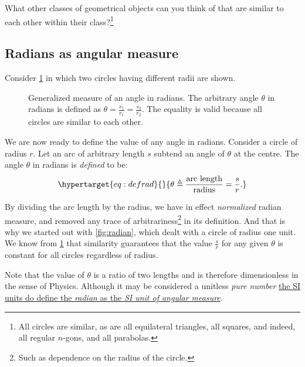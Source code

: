 \documentclass[
  a4paper,
]{article}
\begin{document}
What other classes of geometrical objects can you think of that are
similar to each other within their class?\footnote{All circles are
  similar, as are all equilateral triangles, all squares, and indeed,
  all regular \(n\)-gons, and all parabolas.}

\hypertarget{radians-as-angular-measure}{%
\subsection{Radians as angular
measure}\label{radians-as-angular-measure}}

Consider \cref{fig:general} in which two circles having different radii
are shown.

\begin{figure}
\hypertarget{fig:general}{%
\centering

\caption{Generalized measure of an angle in radians. The arbitrary angle
\(\theta\) in radians is defined as
\(\theta = \frac{s_1}{r_1} = \frac{s_2}{r_2}\). The equality is valid
because all circles are similar to each other.}\label{fig:general}
}
\end{figure}

We are now ready to define the value of any angle in radians. Consider a
circle of radius \(r\). Let an arc of arbitrary length \(s\) subtend an
angle of \(\theta\) at the centre. The angle \(\theta\) in radians is
\emph{defined} to be: \begin{equation}\protect\hypertarget{eq:defrad}{}{
\theta \triangleq \frac{\text{arc length}}{\text{radius}} = \frac{s}{r}.
}\label{eq:defrad}\end{equation}

By dividing the arc length by the radius, we have in effect
\emph{normalized} radian measure, and removed any trace of
arbitrariness\footnote{Such as dependence on the radius of the circle.}
in its definition. And that is why we started out with
\cref{fig:radian}, which dealt with a circle of radius one unit. We know
from \cref{fig:general} that similarity guarantees that the value
\(\frac{s}{r}\) for any given \(\theta\) is constant for all circles
regardless of radius.

Note that the value of \(\theta\) is a ratio of two lengths and is
therefore dimensionless in the sense of Physics. Although it may be
considered a unitless \emph{pure number}
\href{https://en.wikipedia.org/wiki/Radian}{the SI units do define the
\emph{radian} as the \emph{SI unit of angular measure}}.
\end{document}
